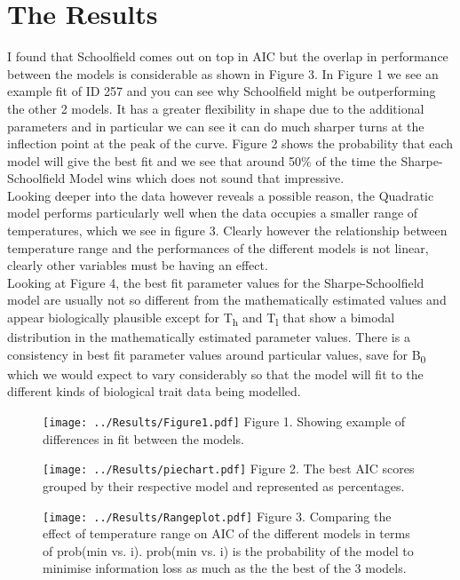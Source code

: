 \documentclass[12pt]{article}\usepackage[]{graphicx}\usepackage[]{color}
\begin{document}
  \section{The Results}
  I found that Schoolfield comes out on top in AIC but the overlap in performance between the models is considerable as shown in Figure 3. 
  In Figure 1 we see an example fit of ID 257 and you can see why Schoolfield 
  might be outperforming the other 2 models. It has a greater flexibility in shape due to the 
  additional parameters and in particular we can see it can do much sharper turns at the inflection point at 
  the peak of the curve. Figure 2 shows the probability that each model will give the best fit and we see that around 50\% of the time
  the Sharpe-Schoolfield Model wins which does not sound that impressive. \\
  Looking deeper into the data however reveals a possible reason, the Quadratic model performs particularly well when the data 
  occupies a smaller range of temperatures, which we see in figure 3. Clearly however the relationship between temperature range and
  the performances of the different models is not linear, clearly other variables must be having an effect. \\
  Looking at Figure 4, the best fit parameter values for 
  the Sharpe-Schoolfield model are usually not so different from the 
  mathematically estimated values and appear biologically plausible except for T\textsubscript{h} and T\textsubscript{l} 
  that show a bimodal distribution in the mathematically estimated parameter values. There is a consistency in best fit parameter values 
  around particular values, save for B\textsubscript{0} which we would expect to vary considerably so that the model will fit to 
  the different kinds of biological trait data being modelled.
  
  \begin{figure}[]
    \texttt{[image: ../Results/Figure1.pdf]}
    Figure 1. Showing example of differences in fit between the models.
  \end{figure}

  \begin{figure}[]
    \texttt{[image: ../Results/piechart.pdf]}
    Figure 2. The best AIC scores grouped by their respective model and represented as percentages. 
  \end{figure}

  \begin{figure}[]
    \texttt{[image: ../Results/Rangeplot.pdf]}
    Figure 3. Comparing the effect of temperature range on AIC of the different models in terms of prob(min vs. i). 
    prob(min vs. i) is the probability of the model to minimise information loss as much as the the best of the 3 models.
  \end{figure}
\end{document}
